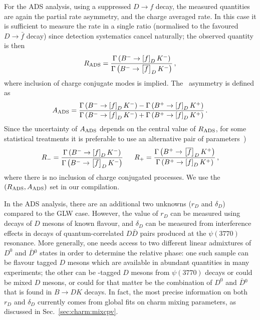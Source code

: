 For the ADS analysis, using a suppressed $D \to f$ decay,
the measured quantities are again the partial rate asymmetry, 
and the charge averaged rate.
In this case it is sufficient to measure the rate in a single ratio
(normalised to the favoured $D \to \bar{f}$ decay)
since detection systematics cancel naturally;
the observed quantity is then
\begin{equation}
  \label{eq:cp_uta:dk:r_ads}
  R_{\rm ADS} = 
  \frac{
    \Gamma \left( \Bm \to \left[ f \right]_D \Km \right)
  }{
    \Gamma \left( \Bm \to \left[ \bar{f} \right]_D \Km \right)
  } \, ,
\end{equation}
where inclusion of charge conjugate modes is implied.
The \CP\ asymmetry is defined as
\begin{equation}
  \label{eq:cp_uta:dk:a_ads}
  A_{\rm ADS} = 
  \frac{
    \Gamma\left(B^{-}\to\left[f\right]_DK^-\right)-
    \Gamma\left(B^{+}\to\left[f\right]_DK^+\right)
  }{
    \Gamma\left(B^{-}\to\left[f\right]_DK^-\right)+
    \Gamma\left(B^{+}\to\left[f\right]_DK^+\right)
  } \, .
\end{equation}
Since the uncertainty of $A_{\rm ADS}$ depends on the central value of $R_{\rm ADS}$, for some statistical treatments it is preferable to use an alternative pair of parameters~\cite{Bondar:2004bi})
\begin{equation}
  R_- = \frac{
    \Gamma \left( \Bm \to \left[ f \right]_D \Km \right)
  }{
    \Gamma \left( \Bm \to \left[ \bar{f} \right]_D \Km \right)
  } \, 
  \hspace{5mm}
  R_+ = \frac{
    \Gamma \left( \Bp \to \left[ \bar{f} \right]_D \Kp \right)
  }{
    \Gamma \left( \Bp \to \left[ f \right]_D \Kp \right)
  } \, ,
\end{equation}
where there is no inclusion of charge conjugated processes.
We use the $(R_{\rm ADS}, A_{\rm ADS})$ set in our compilation.

In the ADS analysis, there are an additional two unknowns ($r_D$ and $\delta_D$)
compared to the GLW case.  
However, the value of $r_D$ can be measured using 
decays of $D$ mesons of known flavour, and $\delta_D$ can be measured from interference effects in decays of quantum-correlated $D\bar{D}$ pairs produced at the $\psi(3770)$ resonance.
More generally, one needs access to two different linear admixtures of $D^0$ and $\bar{D}{}^0$ states in order to determine the relative phase: one such sample can be flavour tagged $D$ mesons which are available in abundant quantities in many experiments; the other can be \CP-tagged $D$ mesons from $\psi(3770)$ decays or could be mixed $D$ mesons, or could for that matter be the combination of $D^0$ and $\bar{D}{}^0$ that is found in $B \to DK$ decays.
In fact, the most precise information on both $r_D$ and $\delta_D$ currently comes from global fits on charm mixing parameters, as discussed in Sec.~\ref{sec:charm:mixcpv}.

